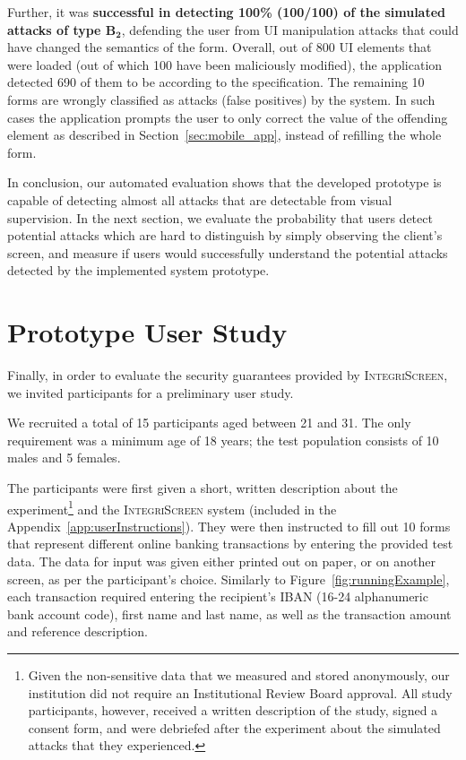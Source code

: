 \documentclass[sigconf, anonymous, balance=false]{acmart}
\newcommand{\myparagraph}[1]{\myparagraphnodot{#1.}}
\newcommand{\myparagraphnodot}[1]{\vspace{4pt} \noindent {\bfseries #1}\xspace}
\newcommand{\B}[1]{$\mathbf{B_#1}$\xspace}
\newcommand{\updatelater}[1]{#1\xspace}
\newcommand{\sysname}{\textsc{IntegriScreen}\xspace}
\begin{document}
Further, it was \textbf{successful in detecting 100\% (100/100) of the simulated attacks of type \B{2}}, defending the user from UI manipulation attacks that could have changed the semantics of the form.
Overall, out of 800 UI elements that were loaded (out of which 100 have been maliciously modified), the application detected 690 of them to be according to the specification. The remaining 10 forms are wrongly classified as attacks (false positives) by the system. In such cases the application prompts the user to only correct the value of the offending element as described in Section~\ref{sec:mobile_app}, instead of refilling the whole form.


In conclusion, our automated evaluation shows that the developed prototype is capable of detecting almost all attacks that are detectable from visual supervision.
In the next section, we evaluate the probability that users detect potential attacks which are hard to distinguish by simply observing the client's screen, and measure if users would successfully understand the potential attacks detected by the implemented system prototype.


\section{Prototype User Study} \label{sec:userStudy}
Finally, in order to evaluate the security guarantees provided by \sysname, we invited participants for a preliminary user study.

\myparagraph{Demographics and instructions}
We recruited a total of \updatelater{15} participants aged between \updatelater{21 and 31}.
The only requirement was a minimum age of 18 years; the test population consists of \updatelater{10} males and \updatelater{5} females.

The participants were first given a short, written description about the experiment\footnote{Given the non-sensitive data that we measured and stored anonymously, our institution did not require an Institutional Review Board approval.
	All study participants, however, received a written description of the study, signed a consent form, and were debriefed after the experiment about the simulated attacks that they experienced.} and the \sysname system (included in the Appendix~\ref{app:userInstructions}).
They were then instructed to fill out 10 forms that represent different online banking transactions by entering the provided test data.
The data for input was given either printed out on paper, or on another screen, as per the participant's choice.
Similarly to Figure~\ref{fig:runningExample}, each transaction required entering the recipient's IBAN (16-24 alphanumeric bank account code), first name and last name, as well as the transaction amount and reference description.
\end{document}
